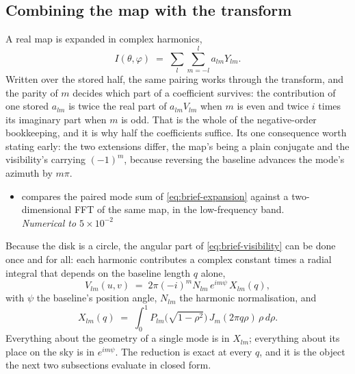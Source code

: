 \subsection{Combining the map with the transform}

A real map is expanded in complex harmonics,
\begin{equation}
  I(\theta,\varphi) \;=\; \sum_{l}\sum_{m=-l}^{l} a_{lm}Y_{lm} .
  \label{eq:brief-expansion}
\end{equation}
Written over the stored half, the same pairing works through the transform, and the parity of
$m$ decides which part of a coefficient survives: the contribution of one stored $a_{lm}$ is
twice the real part of $a_{lm}V_{lm}$ when $m$ is even and twice $i$ times its imaginary part
when $m$ is odd.  That is the whole of the negative-order bookkeeping, and it is why half the
coefficients suffice.  Its one consequence worth stating early: the two extensions differ, the
map's being a plain conjugate and the visibility's carrying $(-1)^m$, because reversing the
baseline advances the mode's azimuth by $m\pi$.


\begin{itemize}
  \item[$\checkmark$]  compares the paired mode sum of
    \eqref{eq:brief-expansion} against a two-dimensional FFT of the same map, in the
    low-frequency band.
    \\[1pt] \quad \emph{Numerical to $5\times10^{-2}$}
\end{itemize}

Because the disk is a circle, the angular part of \eqref{eq:brief-visibility} can be done
once and for all: each harmonic contributes a complex constant times a radial integral that
depends on the baseline length $q$ alone,
\begin{equation}
  V_{lm}(u,v) \;=\; 2\pi(-i)^m N_{lm}\, e^{im\psi}\, X_{lm}(q) ,
  \label{eq:brief-mode}
\end{equation}
with $\psi$ the baseline's position angle, $N_{lm}$ the harmonic normalisation, and
\begin{equation}
  X_{lm}(q) \;=\; \int_0^1 P_{lm}\bigl(\sqrt{1-\rho^2}\bigr)\, J_m(2\pi q\rho)\,
  \rho\, d\rho .
  \label{eq:brief-radial-integral}
\end{equation}
Everything about the geometry of a single mode is in $X_{lm}$; everything about its place on
the sky is in $e^{im\psi}$.  The reduction is exact at every $q$, and it is the object the
next two subsections evaluate in closed form.


